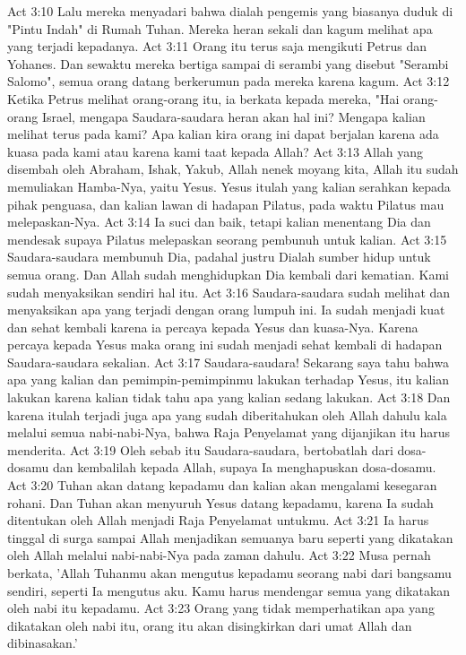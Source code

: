 Act 3:10  Lalu mereka menyadari bahwa dialah pengemis yang biasanya duduk di "Pintu Indah" di Rumah Tuhan. Mereka heran sekali dan kagum melihat apa yang terjadi kepadanya.
Act 3:11  Orang itu terus saja mengikuti Petrus dan Yohanes. Dan sewaktu mereka bertiga sampai di serambi yang disebut "Serambi Salomo", semua orang datang berkerumun pada mereka karena kagum.
Act 3:12  Ketika Petrus melihat orang-orang itu, ia berkata kepada mereka, "Hai orang-orang Israel, mengapa Saudara-saudara heran akan hal ini? Mengapa kalian melihat terus pada kami? Apa kalian kira orang ini dapat berjalan karena ada kuasa pada kami atau karena kami taat kepada Allah?
Act 3:13  Allah yang disembah oleh Abraham, Ishak, Yakub, Allah nenek moyang kita, Allah itu sudah memuliakan Hamba-Nya, yaitu Yesus. Yesus itulah yang kalian serahkan kepada pihak penguasa, dan kalian lawan di hadapan Pilatus, pada waktu Pilatus mau melepaskan-Nya.
Act 3:14  Ia suci dan baik, tetapi kalian menentang Dia dan mendesak supaya Pilatus melepaskan seorang pembunuh untuk kalian.
Act 3:15  Saudara-saudara membunuh Dia, padahal justru Dialah sumber hidup untuk semua orang. Dan Allah sudah menghidupkan Dia kembali dari kematian. Kami sudah menyaksikan sendiri hal itu.
Act 3:16  Saudara-saudara sudah melihat dan menyaksikan apa yang terjadi dengan orang lumpuh ini. Ia sudah menjadi kuat dan sehat kembali karena ia percaya kepada Yesus dan kuasa-Nya. Karena percaya kepada Yesus maka orang ini sudah menjadi sehat kembali di hadapan Saudara-saudara sekalian.
Act 3:17  Saudara-saudara! Sekarang saya tahu bahwa apa yang kalian dan pemimpin-pemimpinmu lakukan terhadap Yesus, itu kalian lakukan karena kalian tidak tahu apa yang kalian sedang lakukan.
Act 3:18  Dan karena itulah terjadi juga apa yang sudah diberitahukan oleh Allah dahulu kala melalui semua nabi-nabi-Nya, bahwa Raja Penyelamat yang dijanjikan itu harus menderita.
Act 3:19  Oleh sebab itu Saudara-saudara, bertobatlah dari dosa-dosamu dan kembalilah kepada Allah, supaya Ia menghapuskan dosa-dosamu.
Act 3:20  Tuhan akan datang kepadamu dan kalian akan mengalami kesegaran rohani. Dan Tuhan akan menyuruh Yesus datang kepadamu, karena Ia sudah ditentukan oleh Allah menjadi Raja Penyelamat untukmu.
Act 3:21  Ia harus tinggal di surga sampai Allah menjadikan semuanya baru seperti yang dikatakan oleh Allah melalui nabi-nabi-Nya pada zaman dahulu.
Act 3:22  Musa pernah berkata, 'Allah Tuhanmu akan mengutus kepadamu seorang nabi dari bangsamu sendiri, seperti Ia mengutus aku. Kamu harus mendengar semua yang dikatakan oleh nabi itu kepadamu.
Act 3:23  Orang yang tidak memperhatikan apa yang dikatakan oleh nabi itu, orang itu akan disingkirkan dari umat Allah dan dibinasakan.'
